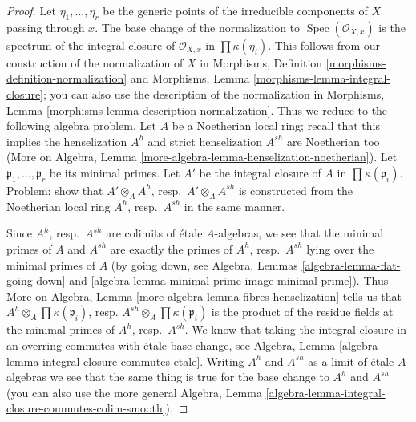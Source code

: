 \documentclass[10pt,a4paper]{amsart}
\theoremstyle{plain}
\theoremstyle{definition}
\theoremstyle{remark}
\numberwithin{equation}{subsection}
\def\Spec{\mathop{\mathrm{Spec}}}
\begin{document}
\begin{proof}
Let $\eta_1, \ldots, \eta_r$ be the generic points of the irreducible
components of $X$ passing through $x$. The base change of the normalization to
$\Spec(\mathcal{O}_{X, x})$ is the spectrum of the
integral closure of $\mathcal{O}_{X, x}$ in $\prod \kappa(\eta_i)$.
This follows from our construction of the normalization of $X$ in
Morphisms, Definition \ref{morphisms-definition-normalization}
and Morphisms, Lemma \ref{morphisms-lemma-integral-closure};
you can also use the description of the normalization
in Morphisms, Lemma \ref{morphisms-lemma-description-normalization}.
Thus we reduce to the following algebra problem.
Let $A$ be a Noetherian local ring; recall that this implies
the henselization $A^h$ and strict henselization $A^{sh}$
are Noetherian too (More on Algebra, Lemma
\ref{more-algebra-lemma-henselization-noetherian}).
Let $\mathfrak p_1, \ldots, \mathfrak p_r$
be its minimal primes. Let $A'$ be the integral closure
of $A$ in $\prod \kappa(\mathfrak p_i)$.
Problem: show that
$A' \otimes_A A^h$, resp.\ $A' \otimes_A A^{sh}$ is constructed
from the Noetherian local ring $A^h$, resp.\ $A^{sh}$ in the same
manner.

\medskip\noindent
Since $A^h$, resp.\ $A^{sh}$ are colimits of \'etale $A$-algebras,
we see that the minimal primes of $A$ and $A^{sh}$ are exactly
the primes of $A^h$, resp.\ $A^{sh}$ lying over the minimal primes
of $A$ (by going down, see
Algebra, Lemmas \ref{algebra-lemma-flat-going-down} and
\ref{algebra-lemma-minimal-prime-image-minimal-prime}).
Thus More on Algebra, Lemma \ref{more-algebra-lemma-fibres-henselization}
tells us that
$A^h \otimes_A \prod \kappa(\mathfrak p_i)$,
resp.
$A^{sh} \otimes_A \prod \kappa(\mathfrak p_i)$
is the product of the residue fields at the minimal primes
of $A^h$, resp.\ $A^{sh}$. We know that taking the
integral closure in an overring commutes with \'etale
base change, see
Algebra, Lemma \ref{algebra-lemma-integral-closure-commutes-etale}.
Writing $A^h$ and $A^{sh}$ as a limit of \'etale $A$-algebras
we see that the same thing is true for the base change to
$A^h$ and $A^{sh}$ (you can also use the more general
Algebra, Lemma \ref{algebra-lemma-integral-closure-commutes-colim-smooth}).
\end{proof}
\end{document}
